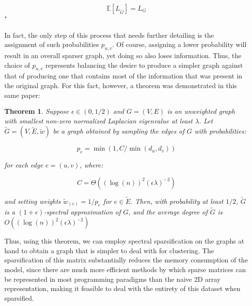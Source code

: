 \documentclass[journal]{IEEEtran}
\newtheorem{theorem}{Theorem}[section]
\begin{document}
$$ \mathbb{E}[L_{\widetilde{G}}] = L_{G} $$" \cite{spectral-sparse}

In fact, the only step of this process that needs further detailing is the assignment of such probabilities $p_{u,v}$. Of course, assigning a lower probability will result in an overall sparser graph, yet doing so also loses information. Thus, the choice of $p_{u,v}$ represents balancing the desire to produce a simpler graph against that of producing one that contains most of the information that was present in the original graph. For this fact, however, a theorem was demonstrated in this same paper:

\begin{theorem}
Suppose $\epsilon\in(0,1/2)$ and $G = (V, E)$ is an unweighted graph with smallest non-zero normalized Laplacian eigenvalue at least $\lambda$. Let $\widetilde{G} = (V, \widetilde{E}, \widetilde{w})$ be a graph obtained by sampling the edges of $G$ with probabilities:

$$ p_e = \min (1,C/\min(d_u, d_v)) $$

for each edge $e = (u,v )$, where: 

$$ C = \Theta ((\log(n))^2 (\epsilon\lambda)^{-2} ) $$

and setting weights $\widetilde{w}_{(e)} = 1/p_e$  for $e\in\widetilde{E}$. Then, with probability at least $1/2$, $\widetilde{G}$ is a $(1 + \epsilon)$-spectral approximation of $G$, and the average degree of $\widetilde{G}$ is $O((\log(n))^2 (\epsilon\lambda)^{−2} )$ \cite{spectral-sparse}
\end{theorem}

Thus, using this theorem, we can employ spectral sparsification on the graphs at hand to obtain a graph that is simpler to deal with for clustering. The sparsification of this matrix substantially reduces the memory consumption of the model, since there are much more efficient methods by which sparse matrices can be represented in most programming paradigms than the naive 2D array representation, making it feasible to deal with the entirety of this dataset when sparsified.
\end{document}
